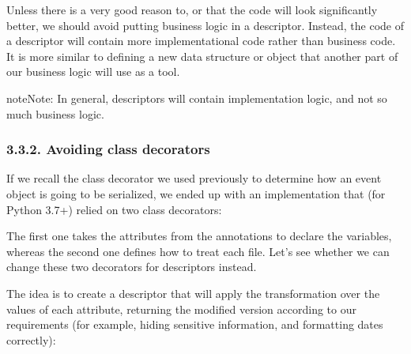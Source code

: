 \documentclass[a4paper,10pt,english]{sphinxmanual}
\begin{document}
Unless there is a very good reason to, or that the code will look significantly better, we
should avoid putting business logic in a descriptor. Instead, the code of a descriptor will
contain more implementational code rather than business code. It is more similar to
defining a new data structure or object that another part of our business logic will use as a
tool.

\begin{sphinxadmonition}{note}{Note:}
In general, descriptors will contain implementation logic, and not so much business logic.
\end{sphinxadmonition}


\subsubsection{3.3.2. Avoiding class decorators}
\label{\detokenize{chapters/6_descriptors/index:avoiding-class-decorators}}
If we recall the class decorator we used previously to determine how an event object is going to be
serialized, we ended up with an implementation that (for Python 3.7+) relied on two class decorators:

\begin{sphinxVerbatim}[commandchars=\\\{\}]
 
     
     
     
     
\end{sphinxVerbatim}

The first one takes the attributes from the annotations to declare the variables, whereas the
second one defines how to treat each file. Let’s see whether we can change these two
decorators for descriptors instead.

The idea is to create a descriptor that will apply the transformation over the values of each
attribute, returning the modified version according to our requirements (for example,
hiding sensitive information, and formatting dates correctly):
\end{document}
